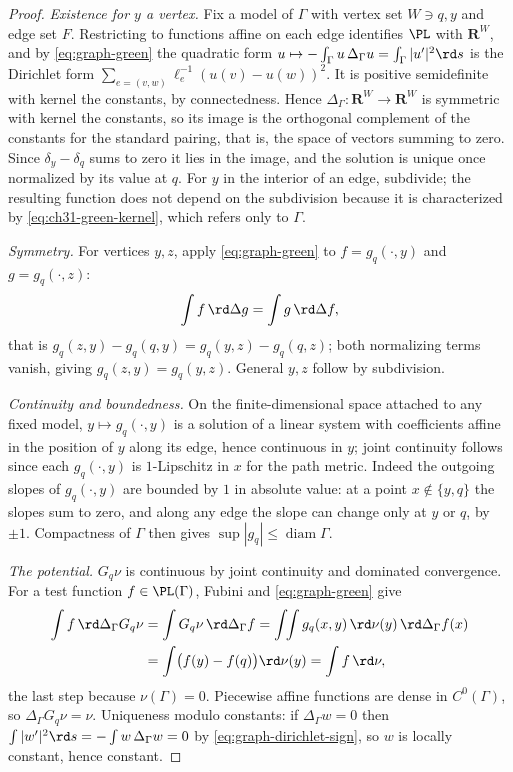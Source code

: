 \begin{proof}
\emph{Existence for \(y\) a vertex.}  Fix a model of \(\Gamma\) with vertex
set \(W\ni q,y\) and edge set \(F\).  Restricting to functions affine on
each edge identifies \(\PL\) with \(\mathbf R^W\), and by
\eqref{eq:graph-green} the quadratic form
\(u\mapsto-\int_\Gamma u\,\Delta_\Gamma u=\int_\Gamma|u'|^2\rd s\) is the
Dirichlet form \(\sum_{e=(v,w)}\ell_e^{-1}(u(v)-u(w))^2\).  It is positive
semidefinite with kernel the constants, by connectedness.  Hence
\(\Delta_\Gamma:\mathbf R^W\to\mathbf R^W\) is symmetric with kernel the
constants, so its image is the orthogonal complement of the constants for
the standard pairing, that is, the space of vectors summing to zero.  Since
\(\delta_y-\delta_q\) sums to zero it lies in the image, and the solution is
unique once normalized by its value at \(q\).  For \(y\) in the interior of
an edge, subdivide; the resulting function does not depend on the
subdivision because it is characterized by \eqref{eq:ch31-green-kernel},
which refers only to \(\Gamma\).

\emph{Symmetry.}  For vertices \(y,z\), apply \eqref{eq:graph-green} to
\(f=g_q(\cdot,y)\) and \(g=g_q(\cdot,z)\):
\[
 \int f\,\rd\Delta g=\int g\,\rd\Delta f,
\]
that is \(g_q(z,y)-g_q(q,y)=g_q(y,z)-g_q(q,z)\); both normalizing terms
vanish, giving \(g_q(z,y)=g_q(y,z)\).  General \(y,z\) follow by
subdivision.

\emph{Continuity and boundedness.}  On the finite-dimensional space
attached to any fixed model, \(y\mapsto g_q(\cdot,y)\) is a solution of a
linear system with coefficients affine in the position of \(y\) along its
edge, hence continuous in \(y\); joint continuity follows since each
\(g_q(\cdot,y)\) is \(1\)-Lipschitz in \(x\) for the path metric.  Indeed
the outgoing slopes of \(g_q(\cdot,y)\) are bounded by \(1\) in absolute
value: at a point \(x\notin\{y,q\}\) the slopes sum to zero, and along any
edge the slope can change only at \(y\) or \(q\), by \(\pm1\).  Compactness
of \(\Gamma\) then gives \(\sup|g_q|\leq\operatorname{diam}\Gamma\).

\emph{The potential.}  \(G_q\nu\) is continuous by joint continuity and
dominated convergence.  For a test function \(f\in\PL(\Gamma)\), Fubini and
\eqref{eq:graph-green} give
\[
 \begin{aligned}
 \int f\,\rd\Delta_\Gamma G_q\nu
  &=\int G_q\nu\,\rd\Delta_\Gamma f
   =\int\!\!\int g_q(x,y)\,\rd\nu(y)\,\rd\Delta_\Gamma f(x)\\
  &=\int\bigl(f(y)-f(q)\bigr)\rd\nu(y)
   =\int f\,\rd\nu,
 \end{aligned}
\]
the last step because \(\nu(\Gamma)=0\).  Piecewise affine functions are
dense in \(C^0(\Gamma)\), so \(\Delta_\Gamma G_q\nu=\nu\).  Uniqueness
modulo constants: if \(\Delta_\Gamma w=0\) then
\(\int|w'|^2\rd s=-\int w\,\Delta_\Gamma w=0\) by
\eqref{eq:graph-dirichlet-sign}, so \(w\) is locally constant, hence
constant.
\end{proof}

